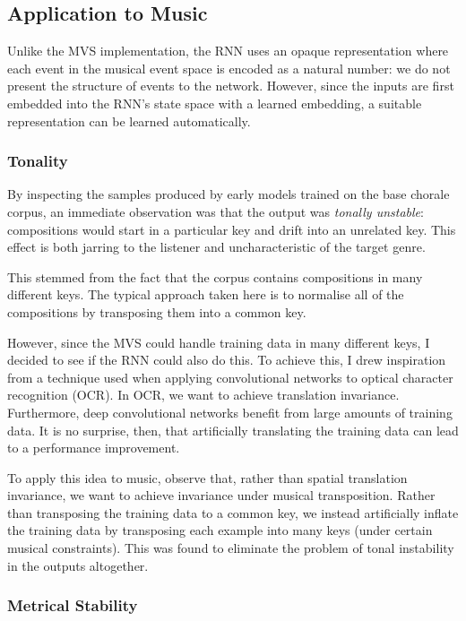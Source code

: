 \documentclass[12pt,a4paper,twoside,openright]{report}
\begin{document}
\subsection{Application to Music}

Unlike the MVS implementation, the RNN uses an opaque representation where each
event in the musical event space is encoded as a natural number: we do not
present the structure of events to the network. However, since the inputs are
first embedded into the RNN's state space with a learned embedding, a suitable
representation can be learned automatically.

\subsubsection{Tonality}

By inspecting the samples produced by early models trained on the base chorale
corpus, an immediate observation was that the output was \emph{tonally
unstable}: compositions would start in a particular key and drift into an
unrelated key. This effect is both jarring to the listener and uncharacteristic
of the target genre.

This stemmed from the fact that the corpus contains compositions in many
different keys. The typical approach taken here is to normalise all of the
compositions by transposing them into a common key.

However, since the MVS could handle training data in many different keys, I
decided to see if the RNN could also do this. To achieve this, I drew
inspiration from a technique used when applying convolutional networks to
optical character recognition (OCR). In OCR, we want to achieve translation
invariance. Furthermore, deep convolutional networks benefit from large amounts
of training data. It is no surprise, then, that artificially translating the
training data can lead to a performance improvement.

To apply this idea to music, observe that, rather than spatial translation
invariance, we want to achieve invariance under musical transposition. Rather
than transposing the training data to a common key, we instead artificially
inflate the training data by transposing each example into many keys (under
certain musical constraints). This was found to eliminate the problem of tonal
instability in the outputs altogether.

\subsubsection{Metrical Stability}
\end{document}
